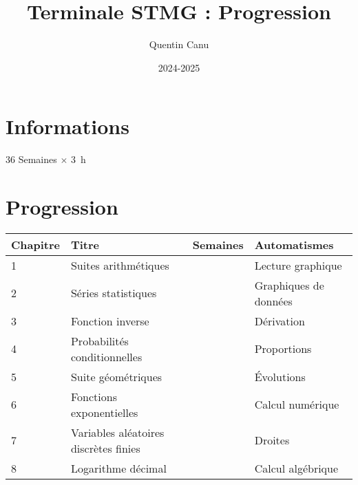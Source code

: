 \documentclass{article}
\title{Terminale STMG : Progression}
\author{Quentin Canu}
\date{2024-2025}
\begin{document}
\maketitle

\section{Informations}

36 Semaines $\times$ \qty{3}{\hour}

\section{Progression}

\begin{center}
    
\begin{tabular}{|l|p{4cm}|p{2cm}|p{3cm}|}
\hline
Chapitre
    & 
Titre
        & 
Semaines
            &
Automatismes\\
\hline
1   &
Suites arithmétiques
        &
            &
Lecture graphique\\
\hline
2   &
Séries statistiques
        &
            &
Graphiques de données\\
\hline
3   &
Fonction inverse
        &
            &
Dérivation\\
\hline
4   &
Probabilités conditionnelles
        &
            &
Proportions\\
\hline
5   &
Suite géométriques
        &
            &
Évolutions\\
\hline
6   &
Fonctions exponentielles
        &
            &
Calcul numérique\\
\hline
7   &
Variables aléatoires discrètes finies
        &
            &
Droites\\
\hline
8   &
Logarithme décimal
        &
            &
Calcul algébrique\\
\hline
\end{tabular}
\end{center}
\end{document}
